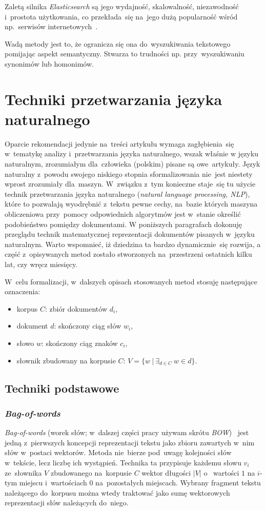 \documentclass[pl]{minipw} %
\begin{document}
Zaletą silnika \textit{Elasticsearch} są jego wydajność, skalowalność, niezawodność i~prostota użytkowania, co przekłada~się na~jego dużą popularność wśród np.~serwisów internetowych~\cite{elastic_companies}.

Wadą metody jest to, że ogranicza się ona do~wyszukiwania tekstowego pomijając aspekt semantyczny. Stwarza to trudności np. przy~wyszukiwaniu synonimów lub homonimów.

\section{Techniki przetwarzania języka naturalnego}
Oparcie rekomendacji jedynie na~treści artykułu wymaga zagłębienia~się w~tematykę analizy i~przetwarzania języka naturalnego, wszak właśnie w języku naturalnym, zrozumiałym dla~człowieka (polskim) pisane są owe~artykuły. Język naturalny z~powodu swojego niskiego stopnia sformalizowania nie~jest niestety wprost zrozumiały dla~maszyn. W~związku z~tym konieczne staje~się tu użycie technik przetwarzania języka naturalnego (\textit{natural language processing, NLP}), które to pozwalają wyodrębnić z~tekstu pewne cechy, na~bazie których maszyna obliczeniowa przy~pomocy odpowiednich algorytmów jest w~stanie określić podobieństwo pomiędzy dokumentami. W poniższych paragrafach dokonuję przeglądu technik matematycznej reprezentacji dokumentów pisanych w~języku naturalnym. Warto wspomnieć, iż dziedzina ta bardzo dynamicznie~się rozwija, a część z~opisywanych metod zostało stworzonych na~przestrzeni ostatnich kilku lat, czy wręcz miesięcy.

W~celu formalizacji, w~dalszych opisach stosowanych metod stosuję następujące oznaczenia:
\begin{itemize}
	\item korpus $C$: zbiór dokumentów $d_i$,
	\item dokument $d$: skończony ciąg słów $w_i$,
	\item słowo $w$: skończony ciąg znaków $c_i$,
	\item słownik zbudowany na korpusie $C$: $V = \{w\ |\ \exists_{d \in C}\ w \in d\}$.
\end{itemize}

\subsection{Techniki podstawowe}

\subsubsection{\textit{Bag-of-words}}
\textit{Bag-of-words} (worek słów; w~dalszej części pracy używam skrótu \textit{BOW})~\cite{bow} jest jedną z~pierwszych koncepcji reprezentacji tekstu jako zbioru zawartych w~nim słów w~postaci wektorów. Metoda nie~bierze pod~uwagę kolejności słów w~tekście, lecz liczbę ich wystąpień. Technika ta przypisuje każdemu słowu $v_i$ ze~słownika $V$ zbudowanego na~korpusie $C$ wektor długości $|V|$ o~ wartości $1$ na $i$-tym miejscu i~wartościach $0$ na~pozostałych miejscach. Wybrany fragment tekstu należącego do~korpusu można wtedy traktować jako sumę wektorowych reprezentacji słów należących do~niego.
\end{document}
